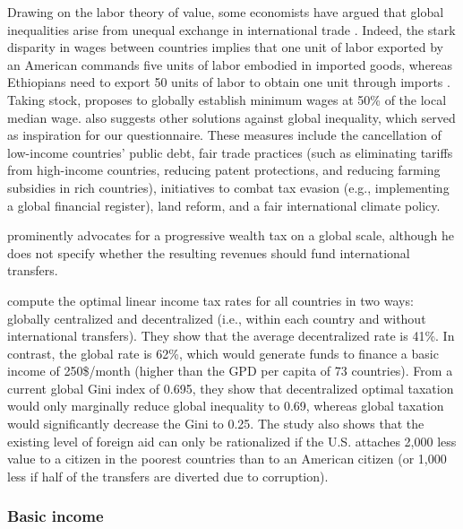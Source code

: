 \documentclass[12pt,english]{article}
\begin{document}
Drawing on the labor theory of value, some economists have argued that global inequalities arise from unequal exchange in international trade \citep{arghiri_unequal_1972}. Indeed, the stark disparity in wages between countries implies that one unit of labor exported by an American commands five units of labor embodied in imported goods, whereas Ethiopians need to export 50 units of labor to obtain one unit through imports \citep{alsamawi_employment_2014,reyes_better_2017}.
Taking stock, \citet{hickel_divide_2017} proposes to globally establish minimum wages at 50\% of the local median wage. \citet{hickel_divide_2017} also suggests other solutions against global inequality, which served as inspiration for our questionnaire. These measures include the cancellation of low-income countries' public debt, fair trade practices (such as eliminating tariffs from high-income countries, reducing patent protections, and reducing farming subsidies in rich countries), initiatives to combat tax evasion (e.g., implementing a global financial register), land reform, and a fair international climate policy. 

\citet{piketty_capital_2014} prominently advocates for a progressive wealth tax on a global scale, although he does not specify whether the resulting revenues should fund international transfers. %

\citet{kopczuk_limitations_2005} compute the optimal linear income tax rates for all countries in two ways: globally centralized and decentralized (i.e., within each country and without international transfers). They show that the average decentralized rate is 41\%. In contrast, the global rate is 62\%, which would generate funds to finance a basic income of 250\$/month (higher than the GPD per capita of 73 countries). From a current global Gini index of 0.695, they show that decentralized optimal taxation would only marginally reduce global inequality to 0.69, whereas global taxation would significantly decrease the Gini to 0.25. The study also shows that the existing level of foreign aid can only be rationalized if the U.S. attaches 2,000 less value to a citizen in the poorest countries than to an American citizen (or 1,000 less if half of the transfers are diverted due to corruption). 


\subsubsection{Basic income}\label{subsubsec:literature_basic_income}
\end{document}
